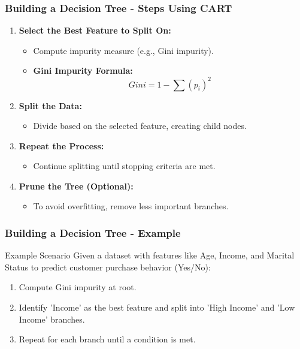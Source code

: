 \documentclass[aspectratio=169]{beamer}
\begin{document}
\begin{frame}
    \frametitle{Building a Decision Tree - Steps Using CART}
    \begin{enumerate}
        \item \textbf{Select the Best Feature to Split On:}
        \begin{itemize}
            \item Compute impurity measure (e.g., Gini impurity).
            \item \textbf{Gini Impurity Formula:}
            \begin{equation}
                Gini = 1 - \sum (p_i)^2
            \end{equation}
        \end{itemize}
        
        \item \textbf{Split the Data:}
        \begin{itemize}
            \item Divide based on the selected feature, creating child nodes.
        \end{itemize}
        
        \item \textbf{Repeat the Process:}
        \begin{itemize}
            \item Continue splitting until stopping criteria are met.
        \end{itemize}
        
        \item \textbf{Prune the Tree (Optional):}
        \begin{itemize}
            \item To avoid overfitting, remove less important branches.
        \end{itemize}
    \end{enumerate}
\end{frame}

\begin{frame}
    \frametitle{Building a Decision Tree - Example}
    \begin{block}{Example Scenario}
        Given a dataset with features like Age, Income, and Marital Status to predict customer purchase behavior (Yes/No):
    \end{block}
    \begin{enumerate}
        \item Compute Gini impurity at root.
        \item Identify 'Income' as the best feature and split into 'High Income' and 'Low Income' branches.
        \item Repeat for each branch until a condition is met.
    \end{enumerate}
\end{frame}
\end{document}
